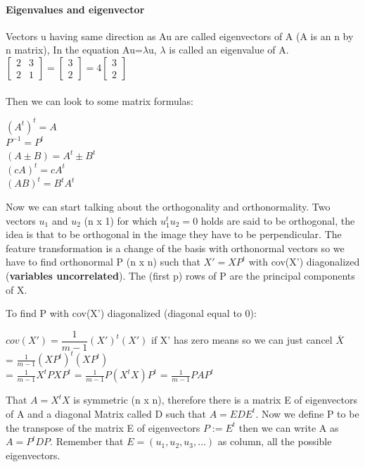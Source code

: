\paragraph{Eigenvalues and eigenvector}
Vectors u having same direction as Au are called eigenvectors of A (A is an n by n matrix),  In the equation Au=$\lambda$u, $\lambda$ is called an eigenvalue of A.\\
$\begin{bmatrix}
    2 & 3 \\
    2 & 1 
\end{bmatrix}
=
\begin{bmatrix}
    3\\
    2
\end{bmatrix}
= 4
\begin{bmatrix}
    3\\
    2
\end{bmatrix}
$\\\\
Then we can look to some matrix formulas:
\begin{center}
    $(A^t)^t =A $\\
    $P^{-1} = P^t$\\
    $(A \pm B) =A^t \pm B^t$\\  
    $(cA)^t =cA^t$\\
    $(AB)^t= B^t A^t$
\end{center}

Now we can start talking about the orthogonality and orthonormality. 
Two vectors $u_1$ and $u_2$ (n x 1) for which $u_1^t u_2=0$ holds are said to be orthogonal, the idea is that to be orthogonal in the image they have to be perpendicular.
The feature transformation is a change of the basis with orthonormal vectors so we have to find orthonormal P (n x n) such that $X'= XP^t$ with cov(X') diagonalized (\textbf{variables uncorrelated}). The (first p) rows of P are the principal components of X.
 
To find P with cov(X') diagonalized (diagonal equal to 0):
\begin{center}
    $ cov(X') = \dfrac{1}{m-1} (X')^t (X')$  if X' has zero means so we can just cancel $\overline{X}$\\
    = $\frac{1}{m-1} (X P^t)^t (XP^t)$ \\
    = $\frac{1}{m-1} X^t P X P^t $ = $\frac{1}{m-1} P(X^t X )P^t $ = $\frac{1}{m-1} PAP^t$
\end{center}

That $A =X^t X$ is symmetric (n x n), therefore there is a matrix E of eigenvectors of A and a diagonal Matrix called D such that $A = EDE^t$. Now we define P to be the transpose of the matrix E of eigenvectors $P:= E^t$ then we can write A as $ A = P^t D P $. Remember that $E = (u_1, u_2, u_3, \dots)$ as column, all the possible eigenvectors.

